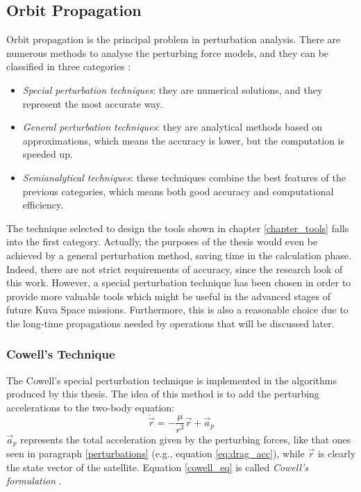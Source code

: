 \subsection{Orbit Propagation} \label{orbit_prop_paragraph}
Orbit propagation is the principal problem in perturbation analysis.
There are numerous methods to analyse the perturbing force models, and they can be classified in three categories  \cite{vallado2013fundamentals}:
\begin{itemize}
    \item \textit{Special perturbation techniques}: they are numerical solutions, and they represent the most accurate way.
    \item \textit{General perturbation techniques}: they are analytical methods based on approximations, which means the accuracy is lower, but the computation is speeded up.
    \item \textit{Semianalytical techniques}: these techniques combine the best features of the previous categories, which means both good accuracy and computational efficiency.
\end{itemize}
The technique selected to design the tools shown in chapter \ref{chapter_tools} falls into the first category.
Actually, the purposes of the thesis would even be achieved by a general perturbation method, saving time in the calculation phase.
Indeed, there are not strict requirements of accuracy, since the research look of this work.
However, a special perturbation technique has been chosen in order to provide more valuable tools which might be useful in the advanced stages of future Kuva Space missions.
Furthermore, this is also a reasonable choice due to the long-time propagations needed by operations that will be discussed later.


\subsubsection{Cowell's Technique}
The Cowell's special perturbation technique is implemented in the algorithms produced by this thesis.
The idea of this method is to add the perturbing accelerations to the two-body equation:
\begin{equation} \label{cowell_eq}
    \ddot{\vec{r}} = - \frac{\mu}{r^3}\vec{r} + \vec{a}_p
\end{equation}
$\vec{a}_p$ represents the total acceleration given by the perturbing forces, like that ones seen in paragraph \ref{perturbations} (e.g., equation \ref{eq:drag_acc}), while $\vec{r}$ is clearly the state vector of the satellite.
Equation \ref{cowell_eq} is called \textit{Cowell's formulation} \cite{vallado2013fundamentals}.




